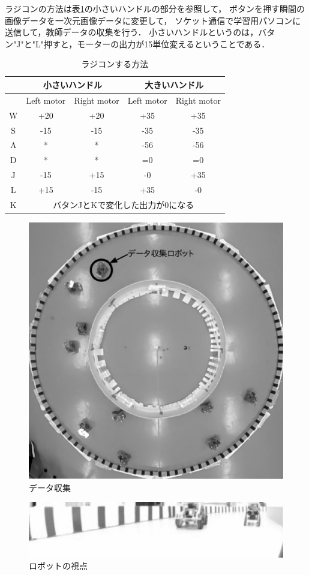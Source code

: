 ラジコンの方法は表\ref{radio_rule}の小さいハンドルの部分を参照して，
ボタンを押す瞬間の画像データを一次元画像データに変更して，
ソケット通信で学習用パソコンに送信して，教師データの収集を行う．
小さいハンドルというのは，バタン"J"と"L"押すと，モーターの出力が15単位変えるということである．

\begin{table}[!ht]
\setlength\tabcolsep{1pt}
\begin{center}
\begin{tabular}{|c|c|c|c|c|}
\hline
 & \multicolumn{2}{|c|}{小さいハンドル} & \multicolumn{2}{c|}{大きいハンドル}\\
\hline
 & Left motor & Right motor & Left motor & Right motor \\
\hline
W & +20 & +20 & +35 & +35\\
\hline
S & -15 & -15 & -35 & -35\\
\hline
A & * & * & -56 & -56\\
\hline
D & * & * & =0 & =0 \\
\hline
J & -15 & +15 & -0 & +35 \\
\hline
L & +15 & -15 & +35 & -0 \\
\hline
K & \multicolumn{4}{|c|}{バタンJとKで変化した出力が0になる} \\
\hline
\end{tabular}
\end{center}
\caption{
ラジコンする方法 
}
\label{radio_rule}
\end{table}



\vspace{-2mm}
\begin{figure}[h]
        \centering
        \includegraphics[width=0.8\linewidth]{teacher_collection.eps}
        \caption{データ収集}
        \label{data_colle}
\end{figure}

\vspace{-5mm}
\begin{figure}[h]
\centering
\includegraphics[width=0.7\linewidth]{robot_eye.eps}
\caption{ロボットの視点}
\label{roboteye}
\end{figure}



